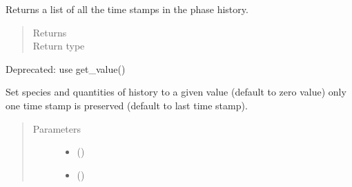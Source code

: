 \documentclass[letterpaper,10pt,openany,oneside,english]{sphinxmanual}
\begin{document}
\begin{fulllineitems}

\begin{fulllineitems}
\label{\detokenize{support_rst/phase:phase.Phase.GetTimeStamps}}
Returns a list of all the time stamps in the phase history.
\begin{quote}\begin{description}
\item[{Returns}] \leavevmode
{}

\item[{Return type}] \leavevmode
{}

\end{description}\end{quote}

\end{fulllineitems}


\begin{fulllineitems}
\label{\detokenize{support_rst/phase:phase.Phase.GetValue}}
Deprecated: use get\_value()

\end{fulllineitems}


\begin{fulllineitems}
\label{\detokenize{support_rst/phase:phase.Phase.ResetHistory}}
Set species and quantities of history to a given value
(default to zero value) only one time stamp is preserved (default to
last time stamp).
\begin{quote}\begin{description}
\item[{Parameters}] \leavevmode\begin{itemize}
\item {} 
 () \textendash{} 

\item {} 
 () \textendash{} 


\end{itemize}
\end{description}
\end{quote}
\end{fulllineitems}
\end{fulllineitems}
\end{document}
